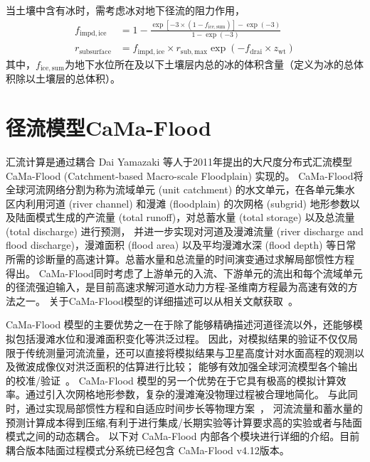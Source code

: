 当土壤中含有冰时，需考虑冰对地下径流的阻力作用，
\begin{equation}
\begin{aligned}
f_{\mathrm{impd,ice}} & = 1 - \frac{\exp \left[-3 \times\left(1-f_{\mathrm{ice,sum}}\right)\right]
    -\exp (-3)}{1-\exp (-3)} \\
 r_{\mathrm{subsurface}} & = f_{\mathrm{impd,ice}} \times r_{\mathrm{sub,max}} 
    \exp \left(-f_{\mathrm{drai}} \times z_{\mathrm{wt}}\right)
\end{aligned}
\end{equation}
其中，$f_{\mathrm{ice,sum}}$为地下水位所在及以下土壤层内总的冰的体积含量（定义为冰的总体积除以土壤层的总体积）。

\section{径流模型CaMa-Flood}

汇流计算是通过耦合 Dai Yamazaki 等人于2011年提出的大尺度分布式汇流模型 CaMa-Flood (Catchment-based Macro-scale Floodplain) 实现的\citep{yamazaki2011physically}。
CaMa-Flood将全球河流网络分割为称为流域单元 (unit catchment) 的水文单元，在各单元集水区内利用河道 (river channel) 和漫滩 (floodplain) 的次网格 (subgrid) 
地形参数以及陆面模式生成的产流量 (total runoff)，对总蓄水量 (total storage) 以及总流量 (total discharge) 进行预测，
并进一步实现对河道及漫滩流量 (river discharge and flood discharge)，漫滩面积 (flood area) 以及平均漫滩水深 (flood depth) 
等日常所需的诊断量的高速计算。总蓄水量和总流量的时间演变通过求解局部惯性方程 \citep{bates2010} 得出。
CaMa-Flood同时考虑了上游单元的入流、下游单元的流出和每个流域单元的径流强迫输入，是目前高速求解河道水动力方程-圣维南方程最为高速有效的方法之一。
关于CaMa-Flood模型的详细描述可以从相关文献获取~\citep{yamazaki2011physically,yamazaki2013improving,yamazaki2014development,yamazaki2014regional}。


CaMa-Flood 模型的主要优势之一在于除了能够精确描述河道径流以外，还能够模拟包括漫滩水位和漫滩面积变化等洪泛过程。
因此，对模拟结果的验证不仅仅局限于传统测量河流流量，还可以直接将模拟结果与卫星高度计对水面高程的观测以及微波成像仪对洪泛面积的估算进行比较；
能够有效加强全球河流模型各个输出的校准/验证~\citep{yamazaki2012analysis,yamazaki2012adjustment}。
CaMa-Flood 模型的另一个优势在于它具有极高的模拟计算效率。通过引入次网格地形参数，复杂的漫滩淹没物理过程被合理地简化。
与此同时，通过实现局部惯性方程和自适应时间步长等物理方案~\citep{bates2010}，
河流流量和蓄水量的预测计算成本得到压缩,有利于进行集成/长期实验等计算要求高的实验或者与陆面模式之间的动态耦合。
以下对 CaMa-Flood 内部各个模块进行详细的介绍。目前耦合版本陆面过程模式分系统已经包含 CaMa-Flood v4.12版本。



